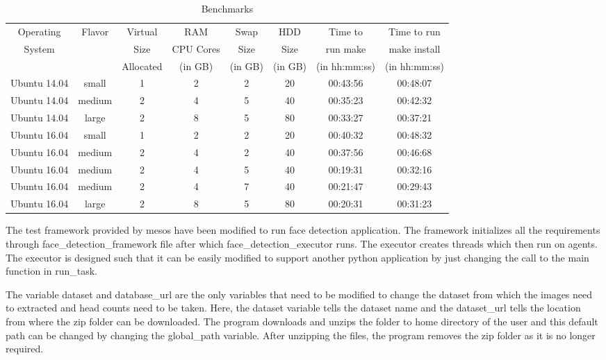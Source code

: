 \documentclass[9pt,twocolumn,twoside]{../../styles/osajnl}
\begin{document}
\begin{table}[t]
\centering
\caption{Benchmarks} 
\label{Performance comparison}
\begin{tabular}{|c|c|c|c|c|c|c|c|}
  \hline
  Operating & Flavor & Virtual & RAM & Swap & HDD & Time to & Time to run\\
  System &  & Size & CPU Cores & Size & Size & run make & make install\\
   &  & Allocated & (in GB) & (in GB) & (in GB) & (in hh:mm:ss) & (in hh:mm:ss)\\
  \hline
  Ubuntu 14.04 & small & 1 & 2 & 2 & 20 & 00:43:56 & 00:48:07 \\
  \hline
  Ubuntu 14.04 & medium & 2 & 4 & 5 & 40 & 00:35:23 & 00:42:32 \\
  \hline
  Ubuntu 14.04 & large & 2 & 8 & 5 & 80 & 00:33:27 & 00:37:21 \\
  \hline
  Ubuntu 16.04 & small & 1 & 2 & 2 & 20 & 00:40:32 & 00:48:32 \\
  \hline
  Ubuntu 16.04 & medium & 2 & 4 & 2 & 40 & 00:37:56 & 00:46:68 \\
  \hline
  Ubuntu 16.04 & medium & 2 & 4 & 5 & 40 & 00:19:31 & 00:32:16 \\
  \hline
  Ubuntu 16.04 & medium & 2 & 4 & 7 & 40 & 00:21:47 & 00:29:43 \\
  \hline
  Ubuntu 16.04 & large & 2 & 8 & 5 & 80 & 00:20:31 & 00:31:23 \\
  \hline
\end{tabular}
\end{table}
The test framework provided by mesos have been modified to run face
detection application. The framework initializes all the requirements
through face\_detection\_framework file after which
face\_detection\_executor runs. The executor creates threads which
then run on agents. The executor is designed such that it can be
easily modified to support another python application by just changing
the call to the main function in run\_task.

The variable dataset and database\_url are the only variables that
need to be modified to change the dataset from which the images need
to extracted and head counts need to be taken. Here, the dataset
variable tells the dataset name and the dataset\_url tells the location
from where the zip folder can be downloaded. The program downloads and
unzips the folder to home directory of the user and this default path can
be changed by changing the global\_path variable. After unzipping the
files, the program removes the zip folder as it is no longer required.
\end{document}
